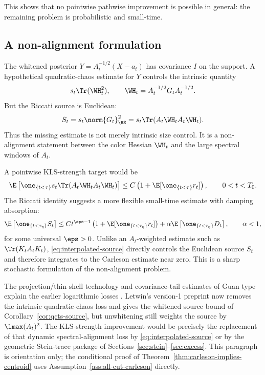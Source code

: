 \documentclass[../../main.tex]{subfiles}
\begin{document}
This shows that no pointwise pathwise improvement is possible in general: the remaining problem is
probabilistic and small-time.

\subsection{A non-alignment formulation}

The whitened posterior $Y=A_t^{-1/2}(X-a_t)$ has covariance $I$ on the support. A hypothetical
quadratic-chaos estimate for $Y$ controls the intrinsic quantity
\[
  s_t\Tr(\WH_t^2),
  \qquad \WH_t=A_t^{-1/2}G_tA_t^{-1/2}.
\]
But the Riccati source is Euclidean:
\begin{equation}\label{eq:euclidean-source}
  S_t=s_t\norm{G_t}_{\HS}^2=s_t\Tr(A_t\WH_tA_t\WH_t).
\end{equation}
Thus the missing estimate is not merely intrinsic size control. It is a non-alignment statement
between the color Hessian $\WH_t$ and the large spectral windows of $A_t$.

A pointwise KLS-strength target would be
\begin{equation}\label{eq:pointwise-nonalignment}
  \E\left[\one_{\{t<\tau\}}s_t\Tr(A_t\WH_tA_t\WH_t)\right]
  \le C\left(1+\E[\one_{\{t<\tau\}}r_t]\right),
  \qquad 0<t<T_0 .
\end{equation}
The Riccati identity suggests a more flexible small-time estimate with damping absorption:
\begin{equation}\label{eq:interpolated-source}
  \E\left[\one_{\{t<\tau_\eta\}}S_t\right]
  \le
  C t^{\eps-1}\left(1+\E[\one_{\{t<\tau_\eta\}}r_t]\right)
  +\alpha\E\left[\one_{\{t<\tau_\eta\}}D_t\right],
  \qquad \alpha<1,
\end{equation}
for some universal $\eps>0$. Unlike an $A_t$-weighted estimate such as
$\Tr(K_tA_tK_t)$, \eqref{eq:interpolated-source} directly controls the Euclidean source $S_t$ and
therefore integrates to the Carleson estimate near zero. This is a sharp stochastic formulation of
the non-alignment problem.

\begin{remark}
The projection/thin-shell technology and covariance-tail estimates of Guan type explain the
earlier logarithmic losses \cite{Klartag2023Logarithmic,Guan2025Tail}. Letwin's version-1
preprint now removes the intrinsic quadratic-chaos loss and gives the whitened source bound of
Corollary~\ref{cor:qcts-source}, but unwhitening still weights the source by
$\lmax(A_t)^2$. The KLS-strength improvement would be precisely the replacement of that dynamic
spectral-alignment loss by \eqref{eq:interpolated-source} or by the geometric Stein-trace
package of Sections~\ref{sec:stein}--\ref{sec:excess}. This paragraph is orientation only; the
conditional proof of Theorem~\ref{thm:carleson-implies-centroid} uses
Assumption~\ref{ass:all-cut-carleson} directly.
\end{remark}
\end{document}
